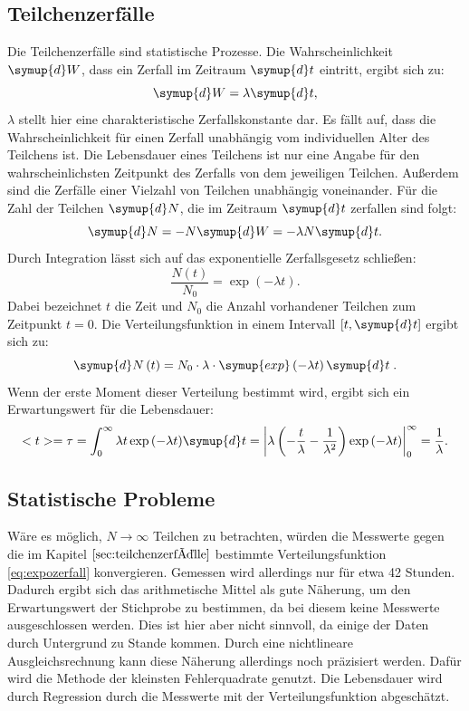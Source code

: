 \documentclass[
  bibliography=totoc,     %
  captions=tableheading,  %
  titlepage=firstiscover, %
]{scrartcl}
\begin{document}
  \subsection{Teilchenzerfälle}
  \label{sec:teilchenzerfälle}
  Die Teilchenzerfälle sind statistische Prozesse.
  Die Wahrscheinlichkeit $\symup{d}W$,
  dass ein Zerfall im Zeitraum $\symup{d}t$ eintritt, ergibt sich zu:
  \begin{equation*}
    \symup{d}W = \lambda\symup{d}t,
  \end{equation*}
  $\lambda$ stellt hier eine charakteristische Zerfallskonstante dar.
  Es fällt auf, dass die Wahrscheinlichkeit für einen Zerfall unabhängig
  vom individuellen Alter des Teilchens ist. Die Lebensdauer eines Teilchens ist
  nur eine Angabe für den wahrscheinlichsten Zeitpunkt des Zerfalls von dem
  jeweiligen Teilchen. Außerdem sind die Zerfälle einer Vielzahl von Teilchen
  unabhängig voneinander. Für die Zahl der Teilchen $\symup{d}N$, die im
  Zeitraum $\symup{d}t$ zerfallen sind folgt:
  \begin{equation*}
    \symup{d}N = -N\symup{d}W = - \lambda N \symup{d}t.
  \end{equation*}
  Durch Integration lässt sich auf das exponentielle Zerfallsgesetz schließen:
  \begin{equation}
    \frac{N(t)}{N_0} = \exp{(-\lambda t)}.
    \label{eq:expozerfall}
  \end{equation}
  Dabei bezeichnet $t$ die Zeit und $N_0$ die Anzahl vorhandener
  Teilchen zum Zeitpunkt $t=0$. Die Verteilungsfunktion in einem Intervall
  $[t, \symup{d}t]$ ergibt sich zu:
  \begin{equation*}
    \symup{d}N \left( t \right) = N_0 \cdot \lambda \cdot \symup{exp} \left( - \lambda t \right) \symup{d}t \; .
  \end{equation*}
  Wenn der erste Moment dieser Verteilung bestimmt wird, ergibt sich ein
  Erwartungswert für die Lebensdauer:
  \begin{equation}
    <t> = \tau = \int_0^\infty \lambda t \exp{(-\lambda t)} \symup{d}t =
    \left| \lambda \left( -\frac{t}{\lambda} - \frac{1}{\lambda^2} \right)\exp{(-\lambda t)}
    \right|_0^\infty = \frac{1}{\lambda}.
    \label{eq:tau}
  \end{equation}
  \subsection{Statistische Probleme}
  Wäre es möglich, $N \to \infty$ Teilchen zu betrachten, würden die Messwerte gegen die
  im Kapitel $\ref{sec:teilchenzerfälle}$
  bestimmte Verteilungsfunktion \eqref{eq:expozerfall} konvergieren. Gemessen
  wird allerdings nur für etwa 42 Stunden. Dadurch ergibt sich das
  arithmetische Mittel als gute Näherung, um den Erwartungswert der Stichprobe
  zu bestimmen, da bei diesem keine Messwerte ausgeschlossen werden. Dies
  ist hier aber nicht sinnvoll, da einige der Daten durch Untergrund zu Stande
  kommen. Durch eine nichtlineare Ausgleichsrechnung kann diese Näherung
  allerdings noch präzisiert werden. Dafür wird die Methode der kleinsten
  Fehlerquadrate genutzt. Die Lebensdauer wird durch
  Regression durch die Messwerte mit der Verteilungsfunktion abgeschätzt.
\end{document}
